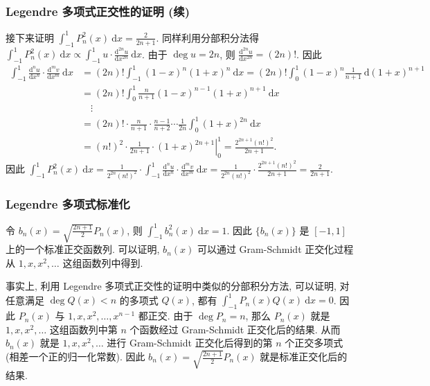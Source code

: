 \begin{frame}
\frametitle{Legendre 多项式正交性的证明 (续)}

接下来证明 $\int_{-1}^1 P_n^2(x) ~ \mathrm{d}x = \frac{2}{2n+1}$.
同样利用分部积分法得 $\int_{-1}^1 P_n^2(x) ~ \mathrm{d}x \propto \int_{-1}^1 u \cdot \frac{\mathrm{d}^{2n} u}{\mathrm{d}x^{2n}} ~ \mathrm{d}x$.
由于 $\deg u = 2n$, 则 $\frac{\mathrm{d}^{2n} u}{\mathrm{d}x^{2n}} = (2n)!$. 因此
\begin{align*}
\int_{-1}^1 \frac{\mathrm{d}^n u}{\mathrm{d}x^n} \cdot \frac{\mathrm{d}^m v}{\mathrm{d}x^m} ~ \mathrm{d}x
& = (2n)! \int_{-1}^1 (1 - x)^n (1 + x)^n ~ \mathrm{d}x = (2n)! \int_0^1 (1 - x)^n \frac{1}{n+1} ~ \mathrm{d} (1 + x)^{n+1} \\
& = (2n)! \int_0^1 \frac{n}{n+1} (1-x)^{n-1} (1+x)^{n+1} ~ \mathrm{d}x \\
& \hspace{1em} \vdots \\
& = (2n)! \cdot \frac{n}{n+1} \cdot \frac{n-1}{n+2} \cdots \frac{1}{2n} \int_0^1 (1+x)^{2n} ~ \mathrm{d}x \\
& = (n!)^2 \cdot \frac{1}{2n+1} \cdot \left. (1+x)^{2n+1} \right|_0^1 = \frac{2^{2n+1} (n!)^2}{2n+1}.
\end{align*}
因此 $\int_{-1}^1 P_n^2(x) ~ \mathrm{d}x = \frac{1}{2^{2n} (n!)^2} \cdot \int_{-1}^1 \frac{\mathrm{d}^n u}{\mathrm{d}x^n} \cdot \frac{\mathrm{d}^m v}{\mathrm{d}x^m} ~ \mathrm{d}x = \frac{1}{2^{2n} (n!)^2} \cdot \frac{2^{2n+1} (n!)^2}{2n+1} = \frac{2}{2n+1}$.

\end{frame}


\begin{frame}
\frametitle{Legendre 多项式标准化}

\begin{remark}
令 $b_n(x) = \sqrt{\frac{2n+1}{2}} P_n(x)$, 则 $\int_{-1}^1 b_n^2(x) ~ \mathrm{d}x = 1$. 因此 $\{b_n(x)\}$ 是 $[-1, 1]$ 上的一个\alert{标准正交函数列}. 可以证明, $b_n(x)$ 可以通过 Gram-Schmidt 正交化过程从 $1, x, x^2, \dots$ 这组函数列中得到.
\end{remark}

\pause
\vspace{1em}

事实上, 利用 Legendre 多项式正交性的证明中类似的分部积分方法, 可以证明, 对任意满足 $\deg Q(x) < n$ 的多项式 $Q(x)$, 都有 $\int_{-1}^1 P_n(x) Q(x) ~ \mathrm{d}x = 0$. 因此 $P_n(x)$ 与 $1, x, x^2, \dots, x^{n-1}$ 都正交. 由于 $\deg P_n = n$, 那么 $P_n(x)$ 就是 $1, x, x^2, \dots$ 这组函数列中第 $n$ 个函数经过 Gram-Schmidt 正交化后的结果. 从而 $b_n(x)$ 就是 $1, x, x^2, \dots$ 进行 Gram-Schmidt 正交化后得到的第 $n$ 个正交多项式 (相差一个正的归一化常数). 因此 $b_n(x) = \sqrt{\frac{2n+1}{2}} P_n(x)$ 就是标准正交化后的结果.

\end{frame}


